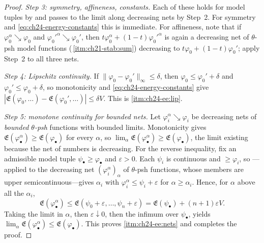 \begin{proof}
\emph{Step 3: symmetry, affineness, constants.}  Each of these holds for
model tuples by  and passes to the limit along
decreasing nets by Step~2.  For symmetry and \eqref{eq:ch24-energy-constants}
this is immediate.  For affineness, note that if
$\varphi_0^\alpha\searrow\varphi_0$ and
$\varphi_0'^\alpha\searrow\varphi_0'$, then
$t\varphi_0^\alpha+(1-t)\varphi_0'^\alpha$ is again a decreasing net of
$\theta$-psh model functions
(\,\cref{itm:ch21-stab:sum}) decreasing to
$t\varphi_0+(1-t)\varphi_0'$; apply Step~2 to all three nets.

\emph{Step 4: Lipschitz continuity.}  If
$\|\varphi_0-\varphi_0'\|_\infty\leq\delta$, then
$\varphi_0\leq\varphi_0'+\delta$ and $\varphi_0'\leq\varphi_0+\delta$,
so monotonicity and \eqref{eq:ch24-energy-constants} give
$|\mathfrak E(\varphi_0,\ldots)-\mathfrak E(\varphi_0',\ldots)|\leq\delta V$.
This is \cref{itm:ch24-ee:lip}.

\emph{Step 5: monotone continuity for bounded nets.}  Let
$\varphi_i^\alpha\searrow\varphi_i$ be decreasing nets of \emph{bounded
$\theta$-psh} functions with bounded limits.  Monotonicity gives
$\mathfrak E(\varphi^\alpha_\bullet)\geq\mathfrak E(\varphi_\bullet)$ for
every $\alpha$, so
$\lim_\alpha\mathfrak E(\varphi^\alpha_\bullet)\geq
 \mathfrak E(\varphi_\bullet)$, the limit existing because the net of
numbers is decreasing.  For the reverse inequality, fix an admissible
model tuple $\psi_\bullet\geq\varphi_\bullet$ and $\varepsilon>0$.  Each
$\psi_i$ is continuous and $\geq\varphi_i$, so
---applied to the decreasing net
$(\varphi_i^\alpha)_\alpha$ of $\theta$-psh functions, whose members are
upper semicontinuous---gives $\alpha_i$ with
$\varphi_i^\alpha\leq\psi_i+\varepsilon$ for $\alpha\geq\alpha_i$.
Hence, for $\alpha$ above all the $\alpha_i$,
\[
 \mathfrak E(\varphi^\alpha_\bullet)
 \leq\mathfrak E(\psi_0+\varepsilon,\ldots,\psi_n+\varepsilon)
 =\mathfrak E(\psi_\bullet)+(n+1)\varepsilon V .
\]
Taking the limit in $\alpha$, then $\varepsilon\downarrow0$, then the
infimum over $\psi_\bullet$, yields
$\lim_\alpha\mathfrak E(\varphi^\alpha_\bullet)\leq
 \mathfrak E(\varphi_\bullet)$.  This proves \cref{itm:ch24-ee:nets} and
completes the proof.
\end{proof}

